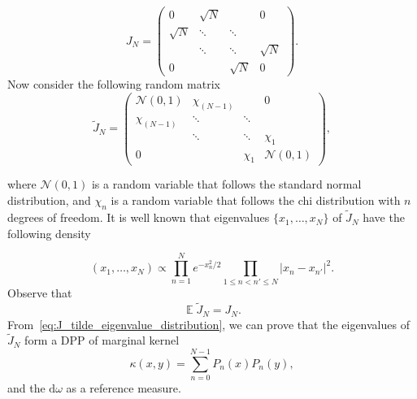 \documentclass[twoside,11pt]{book}
\numberwithin{theorem}{chapter}
\numberwithin{definition}{chapter}
\numberwithin{proposition}{chapter}
\numberwithin{corollary}{chapter}
\numberwithin{example}{chapter}
\numberwithin{lemma}{chapter}
\numberwithin{assumption}{chapter}
\DeclareMathOperator{\DPP}{\mathrm{DPP}}
\DeclareMathOperator{\EX}{\mathbb{E}}
\DeclareMathOperator{\Prb}{\mathbb{P}}
\DeclareMathOperator*{\KDPP}{\mathfrak{K}}
\begin{document}
\begin{equation}
J_N = \left( \begin{array}{cccc}
0 & \sqrt{N} & & 0\\
\sqrt{N} & \ddots & \ddots & \\
& \ddots & \ddots & \sqrt{N} \\
0 & & \sqrt{N} & 0 \end{array} \right).
\end{equation}
Now consider the following random matrix
\begin{equation}
\tilde{J}_N = \left( \begin{array}{cccc}
\mathcal{N}(0,1) & \chi_{(N-1)} & & 0\\
\chi_{(N-1)} & \ddots & \ddots & \\
& \ddots & \ddots & \chi_{1} \\
0 & & \chi_{1} & \mathcal{N}(0,1) \end{array} \right),
\end{equation}

where $\mathcal{N}(0,1)$ is a random variable that follows the standard normal distribution, and $\chi_{n}$ is a random variable that follows the chi distribution with $n$ degrees of freedom.
It is well known that eigenvalues $\{x_{1}, \dots, x_{N} \}$ of $\tilde{J}_{N}$ have the following density \citep{DuEd05}

\begin{equation}\label{eq:J_tilde_eigenvalue_distribution}
(x_{1}, \dots, x_{N}) \propto \prod\limits_{n =1}^{N}e^{-x_{n}^{2}/2} \prod\limits_{1 \leq n<n' \leq N}  |x_{n}-x_{n'}|^{2}.
\end{equation}
Observe that
\begin{equation}
\EX \tilde{J}_N = J_N.
\end{equation}
From~\eqref{eq:J_tilde_eigenvalue_distribution}, we can prove that the eigenvalues of $\tilde{J}_{N}$ form a DPP of marginal kernel 
\begin{equation}
\kappa(x,y) = \sum\limits_{n=0}^{N-1} P_{n}(x)P_{n}(y),
\end{equation}
and the $\mathrm{d}\omega$ as a reference measure.

\end{document}
